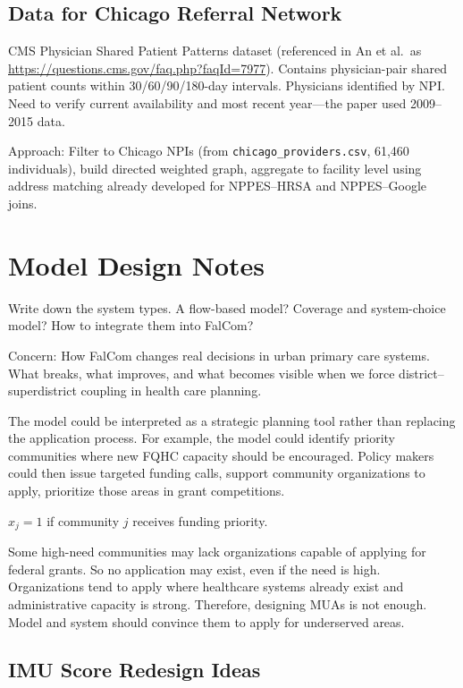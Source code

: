 \documentclass[11pt]{article}
\begin{document}
\subsection*{Data for Chicago Referral Network}

CMS Physician Shared Patient Patterns dataset (referenced in An et al.\ as \url{https://questions.cms.gov/faq.php?faqId=7977}). Contains physician-pair shared patient counts within 30/60/90/180-day intervals. Physicians identified by NPI. Need to verify current availability and most recent year---the paper used 2009--2015 data.

Approach: Filter to Chicago NPIs (from \texttt{chicago\_providers.csv}, 61,460 individuals), build directed weighted graph, aggregate to facility level using address matching already developed for NPPES--HRSA and NPPES--Google joins.

\bigskip

\section*{Model Design Notes}

Write down the system types. A flow-based model? Coverage and system-choice model? How to integrate them into FalCom?

Concern: How FalCom changes real decisions in urban primary care systems.
What breaks, what improves, and what becomes visible when we force district--superdistrict coupling in health care planning.

The model could be interpreted as a strategic planning tool rather than replacing the application process. For example, the model could identify priority communities where new FQHC capacity should be encouraged. Policy makers could then issue targeted funding calls, support community organizations to apply, prioritize those areas in grant competitions.

$x_j= 1$ if community $j$ receives funding priority.

Some high-need communities may lack organizations capable of applying for federal grants. So no application may exist, even if the need is high. Organizations tend to apply where healthcare systems already exist and administrative capacity is strong. Therefore, designing MUAs is not enough. Model and system should convince them to apply for underserved areas.

\subsection*{IMU Score Redesign Ideas}
\end{document}
